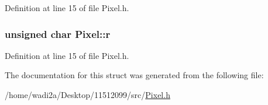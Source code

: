 Definition at line 15 of file Pixel.\+h.

\hypertarget{structPixel_a038ad5b3349e7548d17c5d3bec511b94}{}
\subsubsection[{r}]{\setlength{\rightskip}{0pt plus 5cm}unsigned char Pixel\+::r}\label{structPixel_a038ad5b3349e7548d17c5d3bec511b94}


Definition at line 15 of file Pixel.\+h.



The documentation for this struct was generated from the following file\+:\begin{DoxyCompactItemize}
\item 
/home/wadi2a/\+Desktop/11512099/src/\hyperlink{Pixel_8h}{Pixel.\+h}\end{DoxyCompactItemize}
